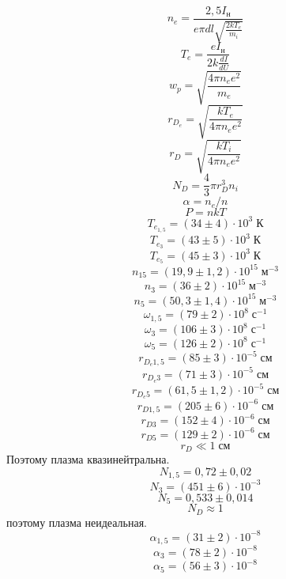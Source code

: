 \[
    n_{e} = \frac{2{,}5I_{\text{н}}}{e \pi dl \sqrt{\frac{2kT_{e}}{m_{i}}}}
\]
\[
    T_{e} = \frac{eI_{\text{н}}}{2k\frac{dI}{dU}}
\]
\[
    w_{p} = \sqrt{\frac{4 \pi n_{e} e^{2}}{m_{e}}}
\]
\[
    r_{D_{e}} = \sqrt{\frac{kT_{e}}{4 \pi n_{e} e^{2}}}
\]
\[
    r_{D} = \sqrt{\frac{kT_{i}}{4 \pi n_{e}e^{2}}}
\]
\[
    N_{D} = \frac{4}{3} \pi r_{D}^{3} n_{i}
\]
\[
    \alpha = n_{e} / n
\]
\[
    P = nkT
\]
\[
    T_{e_{1{,}5}} = \left(34 \pm 4\right)\cdot 10^{3}\;\text{К}
\]
\[
    T_{e_{3}} = \left(43 \pm 5\right)\cdot 10^{3}\;\text{К}
\]
\[
    T_{e_{5}} = \left(45 \pm 3\right)\cdot 10^{3}\;\text{К}
\]
\[
    n_{15} = \left(19{,}9 \pm 1{,}2\right)\cdot 10^{15}\;\text{м}^{-3}
\]
\[
    n_{3} = \left(36 \pm 2\right)\cdot 10^{15}\;\text{м}^{-3}
\]
\[
    n_{5} = \left(50{,}3 \pm 1{,}4\right)\cdot 10^{15}\;\text{м}^{-3}
\]
\[
    \omega_{1{,}5} = \left(79 \pm 2\right)\cdot 10^{8}\;\text{с}^{-1}
\]
\[
    \omega_{3} = \left(106 \pm 3\right)\cdot 10^{8}\;\text{с}^{-1}
\]
\[
    \omega_{5} = \left(126 \pm 2\right)\cdot 10^{8}\;\text{с}^{-1}
\]
\[
    r_{D_{e}1{,}5} = \left(85 \pm 3\right)\cdot 10^{-5}\;\text{см}
\]
\[
    r_{D_{e}3} = \left(71 \pm 3\right)\cdot 10^{-5}\;\text{см}
\]
\[
    r_{D_{e}5} = \left(61{,}5 \pm 1{,}2\right)\cdot 10^{-5}\;\text{см}
\]
\[
    r_{D1{,}5} = \left(205 \pm 6\right)\cdot 10^{-6}\;\text{см}
\]
\[
    r_{D3}= \left(152 \pm 4\right)\cdot 10^{-6}\;\text{см}
\]
\[
    r_{D5} = \left(129 \pm 2\right)\cdot 10^{-6}\;\text{см}
\]
\[
    r_{D} \ll 1\;\text{см}
\]
Поэтому плазма квазинейтральна.
\[
    N_{1{,}5} = 0{,}72 \pm 0{,}02
\]
\[
    N_{3} = \left(451 \pm 6\right)\cdot 10^{-3}
\]
\[
    N_{5} = 0{,}533 \pm 0{,}014
\]
\[
    N_{D} \approx 1
\]
поэтому плазма неидеальная.
\[
    \alpha_{1{,}5} = \left(31 \pm 2\right)\cdot 10^{-8}
\]
\[
    \alpha_{3} = \left(78 \pm 2\right)\cdot 10^{-8}
\]
\[
    \alpha_{5} = \left(56 \pm 3\right)\cdot 10^{-8}
\]

